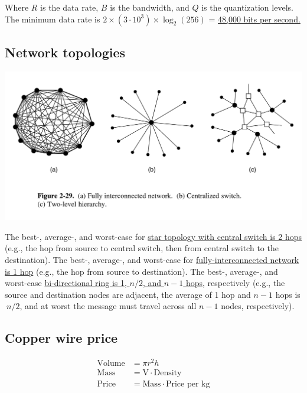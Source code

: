 Where $R$ is the data rate, $B$ is the bandwidth, and $Q$ is the quantization levels. The minimum data rate is $2 \times (3 \cdot 10^3) \times \log_2(256)$ = \ul{48,000 bits per second.}

\subsection{Network topologies}

\includegraphics[width=\the\columnwidth]{network-topologies.png}

The best-, average-, and worst-case for \ul{star topology with central switch is 2 hops} (e.g., the hop from source to central switch, then from central switch to the destination). The best-, average-, and worst-case for \ul{fully-interconnected network is 1 hop} (e.g., the hop from source to destination). The best-, average-, and worst-case \ul{bi-directional ring is 1, $n / 2$, and $n - 1$ hops}, respectively (e.g., the source and destination nodes are adjacent, the average of 1 hop and $n - 1$ hops is $~ n/2$, and at worst the message must travel across all $n - 1$ nodes, respectively).

\subsection{Copper wire price}
\begin{align*}
	\text{Volume} &= \pi r^2 h \\
	\text{Mass} &= \text{V} \cdot \text{Density} \\
	\text{Price} &= \text{Mass} \cdot \text{Price per kg}
\end{align*}

